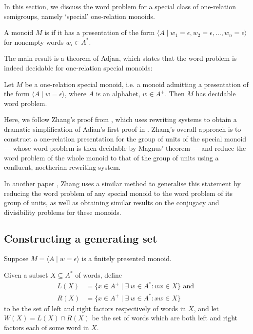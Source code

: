 \documentclass[showlabels,noindex,12pt]{lmaths}
\begin{document}
In this section, we discuss the word problem for a special class of one-relation semigroups, namely `special' one-relation monoids.

\begin{defn} \label{def:special}
	A monoid $M$ is  if it has a presentation of the form $\langle A \mid w_1 = \epsilon, w_2 = \epsilon, \ldots, w_n = \epsilon \rangle$ for nonempty words $w_i \in A^*$.
\end{defn}

The main result is a theorem of Adjan, which states that the word problem is indeed decidable for one-relation special monoids:

\begin{theorem}[Adjan] \label{thm:ors-decidablewp}
	Let $M$ be a one-relation special monoid, i.e. a monoid admitting a presentation of the form $\langle A \mid w = \epsilon\rangle$, where $A$ is an alphabet, $w \in A^+$. Then $M$ has decidable word problem.
\end{theorem}

Here, we follow Zhang's proof from \cite{Zhang1992a}, which uses rewriting systems to obtain a dramatic simplification of Adian's first proof in \cite{Adian1966}. Zhang's overall approach is to construct a one-relation presentation for the group of units of the special monoid --- whose word problem is then decidable by Magnus' theorem --- and reduce the word problem of the whole monoid to that of the group of units using a confluent, noetherian rewriting system.

In another paper \cite{Zhang1992}, Zhang uses a similar method to generalise this statement by reducing the word problem of any special monoid to the word problem of its group of units, as well as obtaining similar results on the conjugacy and divisibility problems for these monoids.


\subsection{Constructing a generating set}

Suppose $M = \langle A \mid w = \epsilon\rangle$ is a finitely presented monoid.

Given a subset $X \subseteq A^*$ of words, define
	\begin{align*}
		L(X) &= \{ x \in A^+ \mid \exists\ w \in A^* \colon wx \in X \} \text{ and } \\
		R(X) &= \{ x \in A^+ \mid \exists\ w \in A^* \colon xw \in X \}
	\end{align*}
to be the set of left and right factors respectively of words in $X$, and let $W(X) = L(X) \cap R(X)$ be the set of words which are both left and right factors each of some word in $X$.
\end{document}
